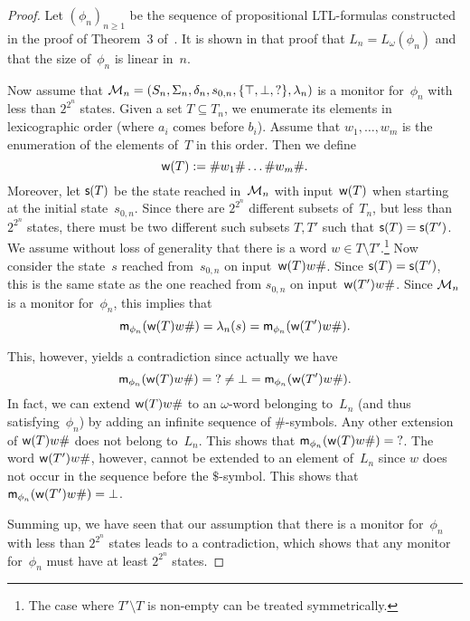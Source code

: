 \begin{proof}
    Let $(\phi_n)_{n\ge 1}$ be the sequence of propositional LTL-formulas
    constructed in the proof of Theorem~3 of~\cite{KuRo-MoChArt10}.  It is shown
    in that proof that $L_n=L_\omega(\phi_n)$ and that the size of~$\phi_n$ is
    linear in~$n$.

    Now assume that
    $\mathcal{M}_n=(S_n,\Sigma_n,\delta_n,s_{0,n},\{\top,\bot,{?}\},\lambda_n)$ is a
    monitor for~$\phi_n$ with less than $2^{2^n}$ states.
    Given a set $T\subseteq T_n$, we enumerate its elements in
    lexicographic order (where $a_i$ comes before $b_i$).  Assume that
    $w_1,\dots,w_m$ is the enumeration of the elements of~$T$ in this order.
    Then we define
    \[\mathsf{w}(T):=\#w_1\#\dots\#w_m\#.\]
    Moreover, let $\mathsf{s}(T)$ be the state reached in~$\mathcal{M}_n$ with
    input~$\mathsf{w}(T)$ when starting at the initial state~$s_{0,n}$.
    Since there are $2^{2^n}$ different subsets of~$T_n$, but less than
    $2^{2^n}$ states, there must be two different such subsets $T,T'$ such that
    $\mathsf{s}(T)=\mathsf{s}(T')$.  We assume without loss of generality that
    there is a word $w\in T\setminus T'$.\footnote{%
        The case where $T'\setminus T$ is non-empty can be treated
        symmetrically.}
    Now consider the state~$s$ reached from~$s_{0,n}$ on input~$\mathsf{w}(T)w\#$.
    Since $\mathsf{s}(T)=\mathsf{s}(T')$, this is the same state as the one reached from
    $s_{0,n}$ on input~$\mathsf{w}(T')w\#$.  Since $\mathcal{M}_n$ is a monitor for~$\phi_n$,
    this implies that
    \[\mathsf{m}_{\phi_n}(\mathsf{w}(T)w\#)=\lambda_n(s)=\mathsf{m}_{\phi_n}(\mathsf{w}(T')w\#).\]

    \noindent
    This, however, yields a contradiction since actually we have
    \[\mathsf{m}_{\phi_n}(\mathsf{w}(T)w\#)={?}\ne\bot=\mathsf{m}_{\phi_n}(\mathsf{w}(T')w\#).\]
    In fact, we can extend $\mathsf{w}(T)w\#$ to an $\omega$-word belonging to~$L_n$
    (and thus satisfying~$\phi_n$) by adding an infinite sequence of
    $\#$-symbols.  Any other extension of $\mathsf{w}(T)w\#$ does not belong to~$L_n$.
    This shows that $\mathsf{m}_{\phi_n}(\mathsf{w}(T)w\#)={?}$.  The word $\mathsf{w}(T')w\#$,
    however, cannot be extended to an element of~$L_n$ since $w$ does not occur
    in the sequence before the $\$$-symbol.  This shows that
    $\mathsf{m}_{\phi_n}(\mathsf{w}(T')w\#)=\bot$.

    Summing up, we have seen that our assumption that there is a monitor
    for~$\phi_n$ with less than $2^{2^n}$ states leads to a contradiction, which
    shows that any monitor for~$\phi_n$ must have at least $2^{2^n}$ states.
\end{proof}

